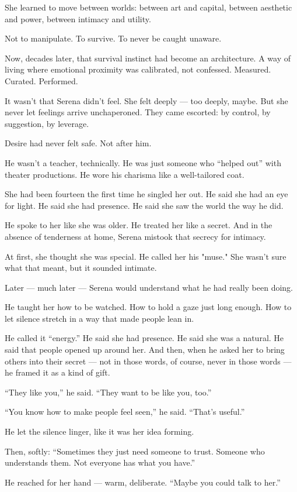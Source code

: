 She learned to move between worlds:
between art and capital, between aesthetic and power, between intimacy and utility.

Not to manipulate.
To survive.
To never be caught unaware.

Now, decades later, that survival instinct had become an architecture.
A way of living where emotional proximity was calibrated, not confessed.
Measured. Curated. Performed.

It wasn’t that Serena didn’t feel.
She felt deeply — too deeply, maybe.
But she never let feelings arrive unchaperoned.
They came escorted: by control, by suggestion, by leverage.

Desire had never felt safe.
Not after him.

He wasn’t a teacher, technically.
He was just someone who ``helped out'' with theater productions.
He wore his charisma like a well-tailored coat.

She had been fourteen the first time he singled her out.
He said she had an eye for light.
He said she had presence.
He said she saw the world the way he did.

He spoke to her like she was older.
He treated her like a secret.
And in the absence of tenderness at home, Serena mistook that secrecy for intimacy.

At first, she thought she was special.
He called her his "muse."
She wasn’t sure what that meant, but it sounded intimate.

Later — much later — Serena would understand what he had really been doing.

He taught her how to be watched.
How to hold a gaze just long enough.
How to let silence stretch in a way that made people lean in.

He called it “energy.”
He said she had presence.
He said she was a natural.
He said that people opened up around her.
And then, when he asked her to bring others into their secret
---
not in those words, of course, never in those words 
---
he framed it as a kind of gift.

“They like you,” he said.
“They want to be like you, too.”

“You know how to make people feel seen,” he said. “That’s useful.”

He let the silence linger, like it was her idea forming.

Then, softly:
“Sometimes they just need someone to trust. Someone who understands them. Not everyone has what you have.”

He reached for her hand — warm, deliberate.
“Maybe you could talk to her.”

